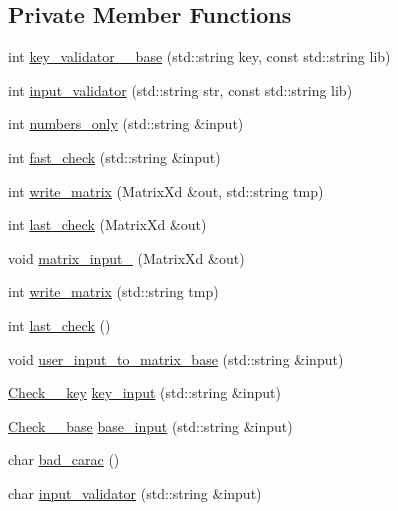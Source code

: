 \subsection*{Private Member Functions}
\begin{DoxyCompactItemize}
\item 
int \hyperlink{class__102_ad1b8619389086293c1823f2cedac2eb1}{key\+\_\+validator\+\_\+\_\+base} (std\+::string key, const std\+::string lib)
\item 
int \hyperlink{class__102_a78780071832acd65d1fcec91e92d6c49}{input\+\_\+validator} (std\+::string str, const std\+::string lib)
\item 
int \hyperlink{class__102_a168860d1755605cd700310e2ded733c3}{numbers\+\_\+only} (std\+::string \&input)
\item 
int \hyperlink{class__102_a543b704bada4df40e12692bad832da3d}{fast\+\_\+check} (std\+::string \&input)
\item 
int \hyperlink{class__102_ab53cdc3d3ff965ccba78000b897087c1}{write\+\_\+matrix} (Matrix\+Xd \&out, std\+::string tmp)
\item 
int \hyperlink{class__102_a1bff799d8c46a418b49639c938af4ca6}{last\+\_\+check} (Matrix\+Xd \&out)
\item 
void \hyperlink{class__102_a532d1a64f5ac775ea3108a4f0329057e}{matrix\+\_\+input\+\_} (Matrix\+Xd \&out)
\item 
int \hyperlink{class__102_ac06410d4ede0164feea5744ff289b427}{write\+\_\+matrix} (std\+::string tmp)
\item 
int \hyperlink{class__102_ab0abff1bfd0dca0e5d3e47d18ff3231a}{last\+\_\+check} ()
\item 
void \hyperlink{class__102_a1fac5d791ec3f16679d04ada71f6e2c9}{user\+\_\+input\+\_\+to\+\_\+matrix\+\_\+base} (std\+::string \&input)
\item 
\hyperlink{class__102_a42c689eb145f12ea5e1959bbc3c8feb9}{Check\+\_\+\_\+key} \hyperlink{class__102_a5df2cca01360523e282d74ccf7a74661}{key\+\_\+input} (std\+::string \&input)
\item 
\hyperlink{class__102_a4d2a75091d5c3bedfba6c129a8ed49f1}{Check\+\_\+\_\+base} \hyperlink{class__102_a69d2442d8380d8c93ed68a96faddecae}{base\+\_\+input} (std\+::string \&input)
\item 
char \hyperlink{class__102_a5672275701c048a518fcdcf67d671275}{bad\+\_\+carac} ()
\item 
char \hyperlink{class__102_aafd54aef9041a20486af9e9681b5a250}{input\+\_\+validator} (std\+::string \&input)
\end{DoxyCompactItemize}
